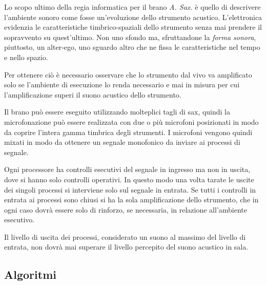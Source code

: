 \documentclass[10pt, a4paper, twoside]{book}
\begin{document}
\begin{multicols}{2}

Lo scopo ultimo della regia informatica per il brano \emph{A. Sax.} è quello di descrivere l'ambiente sonoro come fosse un'evoluzione dello strumento acustico. L'elettronica evidenzia le caratteristiche timbrico-spaziali dello strumento senza mai prendere il sopravvento su quest'ultimo. Non uno sfondo ma, sfruttandone la \emph{forma sonora}, piuttosto, un alter-ego, uno sguardo altro che ne fissa le caratteristiche nel tempo e nello spazio.

Per ottenere ciò è necessario osservare che lo strumento dal vivo va amplificato solo se l'ambiente di esecuzione lo renda necessario e mai in misura per cui l'amplificazione superi il suono acustico dello strumento. 


Il brano può essere eseguito utilizzando molteplici tagli di sax, quindi la microfonazione può essere realizzata con due o più microfoni posizionati in modo da coprire l'intera gamma timbrica degli strumenti. I microfoni vengono quindi mixati in modo da ottenere un segnale monofonico da inviare ai processi di segnale.

Ogni processore ha controlli esecutivi del segnale in ingresso ma non in uscita, dove si hanno solo controlli operativi. In questo modo una volta tarate le uscite dei singoli processi si interviene solo sul segnale in entrata. Se tutti i controlli in entrata ai processi sono chiusi si ha la sola amplificazione dello strumento, che in ogni caso dovrà essere solo di rinforzo, se necessaria, in relazione all'ambiente esecutivo.

Il livello di uscita dei processi, considerato un suono al massimo del livello di entrata, non dovrà mai superare il livello percepito del suono acustico in sala. 

\end{multicols}

\subsection*{Algoritmi}
\end{document}
